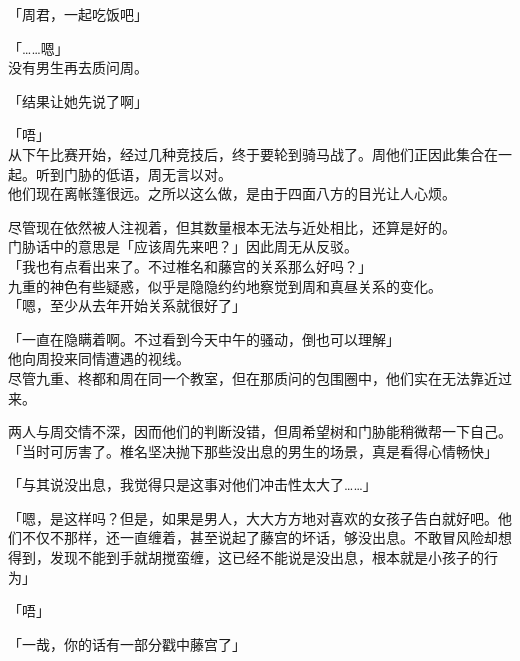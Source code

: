 「周君，一起吃饭吧」

「……嗯」\\

没有男生再去质问周。\\

\vspace{2\baselineskip}

「结果让她先说了啊」

「唔」\\

从下午比赛开始，经过几种竞技后，终于要轮到骑马战了。周他们正因此集合在一起。听到门胁的低语，周无言以对。\\

他们现在离帐篷很远。之所以这么做，是由于四面八方的目光让人心烦。

尽管现在依然被人注视着，但其数量根本无法与近处相比，还算是好的。\\

门胁话中的意思是「应该周先来吧？」因此周无从反驳。\\

「我也有点看出来了。不过椎名和藤宫的关系那么好吗？」\\

九重的神色有些疑惑，似乎是隐隐约约地察觉到周和真昼关系的变化。\\

「嗯，至少从去年开始关系就很好了」

「一直在隐瞒着啊。不过看到今天中午的骚动，倒也可以理解」\\

他向周投来同情遭遇的视线。\\

尽管九重、柊都和周在同一个教室，但在那质问的包围圈中，他们实在无法靠近过来。

两人与周交情不深，因而他们的判断没错，但周希望树和门胁能稍微帮一下自己。\\

「当时可厉害了。椎名坚决抛下那些没出息的男生的场景，真是看得心情畅快」

「与其说没出息，我觉得只是这事对他们冲击性太大了……」

「嗯，是这样吗？但是，如果是男人，大大方方地对喜欢的女孩子告白就好吧。他们不仅不那样，还一直缠着，甚至说起了藤宫的坏话，够没出息。不敢冒风险却想得到，发现不能到手就胡搅蛮缠，这已经不能说是没出息，根本就是小孩子的行为」

「唔」

「一哉，你的话有一部分戳中藤宫了」\\

